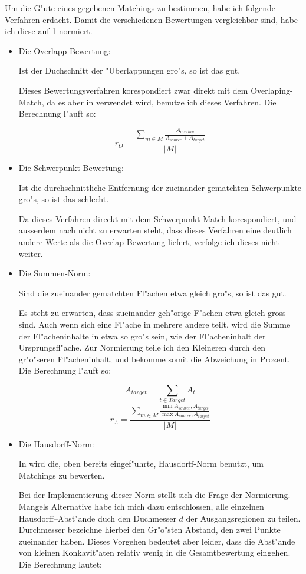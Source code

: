 Um die G"ute eines gegebenen Matchings zu bestimmen, habe ich folgende Verfahren erdacht. Damit die verschiedenen Bewertungen vergleichbar sind, habe ich diese auf 1 normiert.
\begin{itemize}
\item Die Overlapp-Bewertung: 

Ist der Duchschnitt der "Uberlappungen gro"s, so ist das gut.

Dieses Bewertungsverfahren korespondiert zwar direkt mit dem Overlaping-Match, da es aber in \cite{AFRW} verwendet wird, benutze ich dieses Verfahren. Die Berechnung l"auft so:

$$r_O=\frac{\sum_{m\in M} \frac{A_{overlap}}{A_{source}+A_{target}}}{|M|}$$

\item Die Schwerpunkt-Bewertung:

Ist die durchschnittliche Entfernung der zueinander gematchten Schwerpunkte gro"s, so ist das schlecht.

Da dieses Verfahren direckt mit dem Schwerpunkt-Match korespondiert, und ausserdem nach \cite{AFRW} nicht zu erwarten steht, dass dieses Verfahren eine deutlich andere Werte als die Overlap-Bewertung liefert, verfolge ich dieses nicht weiter.

\item Die Summen-Norm:

Sind die zueinander gematchten Fl"achen etwa gleich gro"s, so ist das gut. 

Es steht zu erwarten, dass zueinander geh"orige F"achen etwa gleich gross sind. Auch wenn sich eine Fl"ache in mehrere andere teilt, wird die Summe der Fl"acheninhalte in etwa so gro"s sein, wie der Fl"acheninhalt der Ursprungsfl"ache. Zur Normierung teile ich den Kleineren durch den gr"o"seren Fl"acheninhalt, und bekomme somit die Abweichung in Prozent. Die Berechnung l"auft so:

$$A_{target}=\sum_{t\in Target}A_t$$
$$r_A=\frac {\sum_{m\in M}\frac{\min{A_{source},A_{target}}}{\max{A_{source},A_{target}}}}{|M|}$$

\item Die Hausdorff-Norm:

In \cite{AAR} wird die,  oben bereits eingef"uhrte, Hausdorff-Norm benutzt, um Matchings zu bewerten. 

Bei der Implementierung dieser Norm stellt sich die Frage der Normierung. Mangels Alternative habe ich mich dazu entschlossen, alle einzelnen Hausdorff--Abst"ande duch den Duchmesser $d$ der Ausgangsregionen zu teilen.  Durchmesser bezeichne hierbei den Gr"o"sten Abstand, den zwei Punkte zueinander haben. Dieses Vorgehen bedeutet aber leider, dass die Abst"ande von kleinen Konkavit"aten relativ wenig in die Gesamtbewertung eingehen. Die Berechnung lautet:


\end{itemize}
